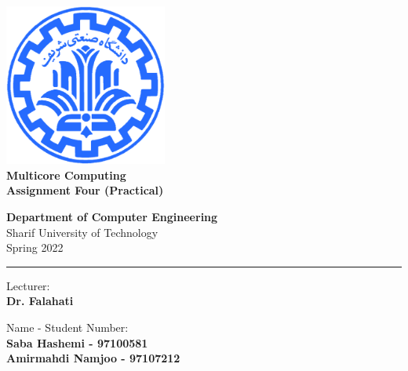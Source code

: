 \documentclass[12pt]{article}
\begin{document}
	
	
	\begin{titlepage}
		\begin{center}
			
			\vspace*{0.7cm}
			
			\includegraphics[width=0.4\textwidth]{sharif1.png}\\
			\vspace{0.5cm}
			\textbf{ \Huge{Multicore Computing} }\\
			\vspace{0.5cm}
			\textbf{ \Large{ Assignment Four (Practical)} }
			\vspace{0.2cm}
			
			
			\large \textbf{Department of Computer Engineering}\\\vspace{0.2cm}
			\large   Sharif University of Technology\\\vspace{0.2cm}
			\large   Spring 2022 \\\vspace{0.2cm}
			\noindent\rule[1ex]{\linewidth}{1pt}
			Lecturer:\\
			\textbf{{Dr. Falahati}}
			
			
			\vspace{0.15cm}
			Name - Student Number:\\
			
			\textbf{{Saba Hashemi - 97100581}}\\
			
			\textbf{{Amirmahdi Namjoo - 97107212}}
		\end{center}
	\end{titlepage}
	
	
	\newpage
	\pagestyle{fancy}
	\fancyhf{}
	\fancyfoot{}
	\cfoot{\thepage}
	
\end{document}
